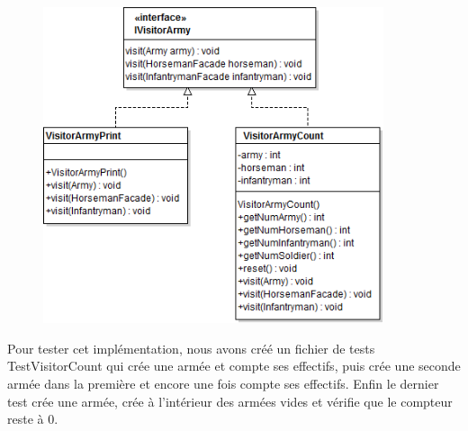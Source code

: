 \documentclass[%
a4paper,
11pt
]{article}
\begin{document}
\begin{figure}[!ht]
    \center
    \includegraphics[width = 10cm]{imgs/Visitor.png}
\end{figure}

Pour tester cet implémentation, nous avons créé un fichier de tests TestVisitorCount qui crée une armée et compte ses effectifs, puis crée une seconde armée dans la première et encore une fois compte ses effectifs. Enfin le dernier test crée une armée, crée à l'intérieur des armées vides et vérifie que le compteur reste à 0.
\end{document}
